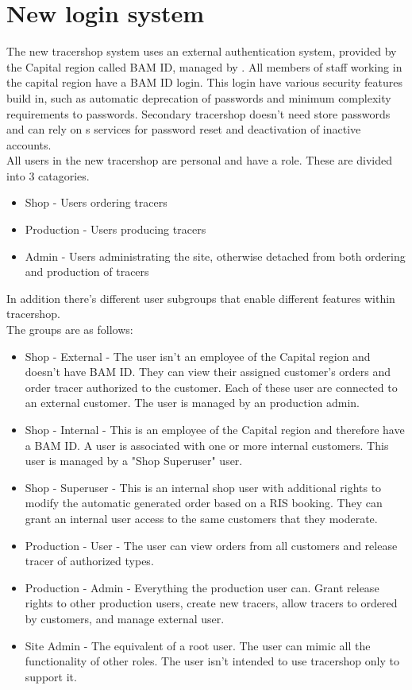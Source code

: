 \documentclass{article}
\begin{document}
\section*{New login system}

The new tracershop system uses an external authentication system, provided by the Capital region called BAM ID, managed by . All members of staff working in the capital region
have a BAM ID login. This login have various security features build in, such as automatic deprecation of passwords and minimum complexity requirements to passwords.
Secondary tracershop doesn't need store passwords and can rely on s services for password reset and deactivation of inactive accounts.\\
All users in the new tracershop are personal and have a role. These are divided into 3 catagories.

\begin{itemize}
  \item Shop - Users ordering tracers
  \item Production - Users producing tracers
  \item Admin - Users administrating the site, otherwise detached from both ordering and production of tracers
\end{itemize}

In addition there's different user subgroups that enable different features within tracershop.\\
The groups are as follows:

\begin{itemize}
  \item Shop - External - The user isn't an employee of the Capital region and doesn't have BAM ID. They can view their assigned customer's orders and order tracer authorized to the customer.
  Each of these user are connected to an external customer. The user is managed by an production admin.
  \item Shop - Internal - This is an employee of the Capital region and therefore have a BAM ID. A user is associated with one or more internal customers. This user is managed by a "Shop Superuser" user.
  \item Shop - Superuser - This is an internal shop user with additional rights to modify the automatic generated order based on a RIS booking.
  They can grant an internal user access to the same customers that they moderate.
  \item Production - User - The user can view orders from all customers and release tracer of authorized types.
  \item Production - Admin - Everything the production user can. Grant release rights to other production users, create new tracers, allow tracers to ordered by customers, and
  manage external user.
  \item Site Admin - The equivalent of a root user. The user can mimic all the functionality of other roles. The user isn't intended to use tracershop only to support it.
\end{itemize}
\end{document}
